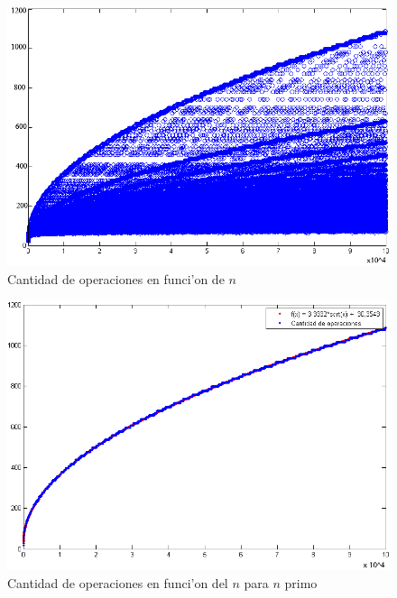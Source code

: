 \begin{figure}[H]
\centering
\includegraphics[scale=0.7]{../../codigo/ejercicio1/benchmark/graficos/todos_los_numeros/graficosTodos.png}
\caption{Cantidad de operaciones en funci'on de $n$}
\label{Ej1fig1}
\end{figure}

\begin{figure}[H]
\centering
\includegraphics[scale=0.8]{../../codigo/ejercicio1/benchmark/graficos/primos/graficoPrimos.png}
\caption{Cantidad de operaciones en funci'on del $n$ para $n$ primo}
\label{Ej1fig2}
\end{figure}


